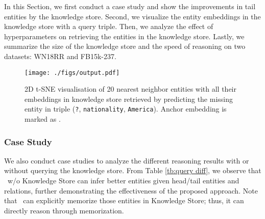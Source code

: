 \documentclass[runningheads]{llncs}
\begin{document}
In this Section, we first conduct a case study and show the improvements in tail entities by the knowledge store.
Second, we visualize the entity embeddings in the knowledge store with a query triple.
Then, we analyze the effect of hyperparameters on retrieving the entities in the knowledge store.
Lastly, we summarize the size of the knowledge store and the speed of reasoning on two datasets: WN18RR and FB15k-237.

\begin{figure}[!htb] \centering \texttt{[image: ./figs/output.pdf]} \caption{2D t-SNE visualisation of 20 nearest neighbor entities with all their embeddings in knowledge store retrieved by predicting the missing entity in triple (\texttt{?}, \texttt{nationality}, \texttt{America}).
Anchor embedding is marked as .} 
\label{fig:visualization}
\end{figure} 

\subsubsection{\textbf{Case Study}}
We also conduct case studies to analyze the different reasoning results with or without querying the knowledge store. 
From Table \ref{tb:query diff}, we observe that \ours~w/o Knowledge Store can infer better entities given head/tail entities and relations, further demonstrating the effectiveness of the proposed approach.
Note that \ours~can explicitly memorize those entities in Knowledge Store; thus, it can directly reason through memorization.


\begin{table}[!htb]

\centering
\caption{First five entities with their probability predicted by \ours~w/o Knowledge Store, and its reranking with \ours, for two example queries.}

\label{tb:query diff}
\end{table} 
\end{document}
